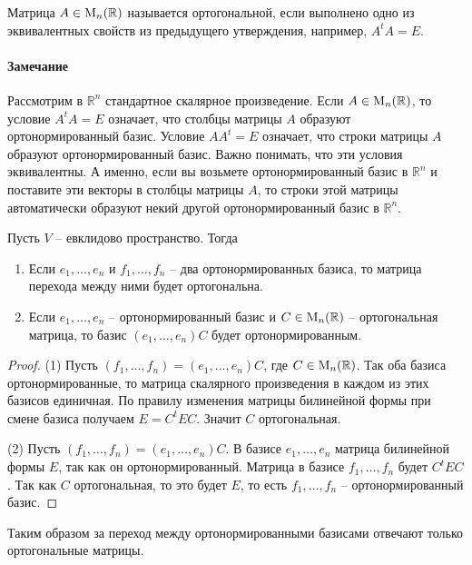 \begin{definition}
Матрица $A\in \operatorname{M}_{n}(\mathbb R)$ называется ортогональной, если выполнено одно из эквивалентных свойств из предыдущего утверждения, например, $A^t A = E$.
\end{definition}

\paragraph{Замечание}
Рассмотрим в $\mathbb R^n$ стандартное скалярное произведение. Если $A\in\operatorname{M}_{n}(\mathbb R)$, то условие $A^t A = E$ означает, что столбцы матрицы $A$ образуют ортонормированный базис. Условие $A A^t = E$ означает, что строки матрицы $A$ образуют ортонормированный базис. Важно понимать, что эти условия эквивалентны. А именно, если вы возьмете ортонормированный базис в $\mathbb R^n$ и поставите эти векторы в столбцы матрицы $A$, то строки этой матрицы автоматически образуют некий другой ортонормированный базис в $\mathbb R^n$.

\begin{claim}\label{claim::OrthoBasisDiscrEucl}
Пусть $V$ -- евклидово пространство. Тогда
\begin{enumerate}
\item Если $e_1,\ldots,e_n$ и $f_1,\ldots,f_n$ -- два ортонормированных базиса, то матрица перехода между ними будет ортогональна.
\item Если $e_1,\ldots,e_n$ -- ортонормированный базис и $C\in \operatorname{M}_{n}(\mathbb R)$ -- ортогональная матрица, то базис $(e_1,\ldots,e_n)C$ будет ортонормированным.
\end{enumerate}
\end{claim}
\begin{proof}
(1) Пусть $(f_1,\ldots,f_n) = (e_1,\ldots,e_n)C$, где $C\in \operatorname{M}_{n}(\mathbb R)$. Так оба базиса ортонормированные, то матрица скалярного произведения в каждом из этих базисов единичная. По правилу изменения матрицы билинейной формы при смене базиса получаем $E = C^t E C$. Значит $C$ ортогональная.

(2) Пусть $(f_1,\ldots,f_n) = (e_1,\ldots,e_n)C$. В базисе $e_1,\ldots,e_n$ матрица билинейной формы $E$, так как он ортонормированный. Матрица в базисе $f_1,\ldots,f_n$ будет $C^t E C$. Так как $C$ ортогональная, то это будет $E$, то есть $f_1,\ldots,f_n$ -- ортонормированный базис.
\end{proof}

Таким образом за переход между ортонормированными базисами отвечают только ортогональные матрицы.

